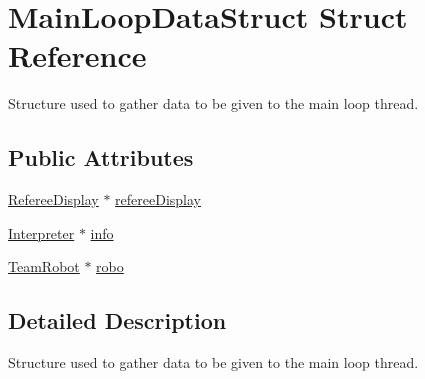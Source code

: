 \hypertarget{structMainLoopDataStruct}{
\section{MainLoopDataStruct Struct Reference}
\label{structMainLoopDataStruct}
}


Structure used to gather data to be given to the main loop thread.  


\subsection*{Public Attributes}
\begin{DoxyCompactItemize}
\item 
\hyperlink{classRefereeDisplay}{RefereeDisplay} $\ast$ \hyperlink{structMainLoopDataStruct_aa273613df69e543077da8ce912276ac5}{refereeDisplay}
\item 
\hyperlink{classInterpreter}{Interpreter} $\ast$ \hyperlink{structMainLoopDataStruct_ac4fccc92ef0456a58ec4841007534f3b}{info}
\item 
\hyperlink{classTeamRobot}{TeamRobot} $\ast$ \hyperlink{structMainLoopDataStruct_a4d464e12c4d8f8ac1fc882c75753597b}{robo}
\end{DoxyCompactItemize}


\subsection{Detailed Description}
Structure used to gather data to be given to the main loop thread. 

